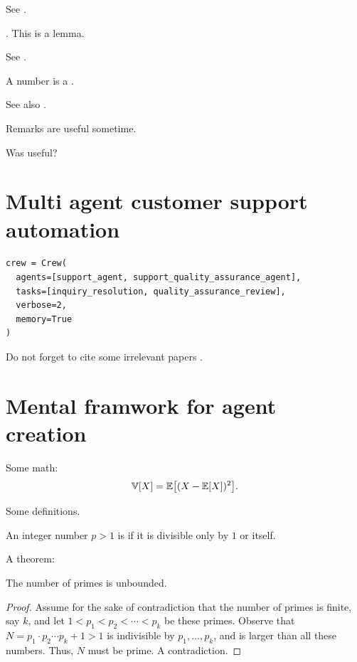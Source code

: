 \documentclass[12pt]{article}
\begin{document}

See .
\begin{lemma}
    .
    This is a lemma.
\end{lemma}

See .

\begin{definition}
    A number is a .
\end{definition}

See also .

\begin{remark}
    Remarks are useful sometime.
\end{remark}

Was  useful?

\section{Multi agent customer support automation}
\begin{verbatim}
crew = Crew(
  agents=[support_agent, support_quality_assurance_agent],
  tasks=[inquiry_resolution, quality_assurance_review],
  verbose=2,
  memory=True
)
\end{verbatim}

Do not forget to cite some irrelevant papers \cite{k-spda-10}.


\section{Mental framwork for agent creation}
Some math:
\begin{equation*}
    \Var{X}%
    =%
    \Ex{(X - \Ex{X})^2}.
\end{equation*}

Some definitions.
\begin{defn}
    An integer number $p > 1$ is  if it is divisible
    only by $1$ or itself.
\end{defn}

A theorem:
\begin{theorem}
    The number of primes is unbounded.
\end{theorem}
\begin{proof}
    Assume for the sake of contradiction that the number of primes is
    finite, say $k$, and let $1 < p_1< p_2 < \cdots < p_k$ be these
    primes. Observe that $N = p_1 \cdot p_2 \cdots p_k +1 > 1$ is
    indivisible by $p_1, \ldots, p_k$, and is larger than all these
    numbers. Thus, $N$ must be prime. A contradiction.
\end{proof}
\end{document}
